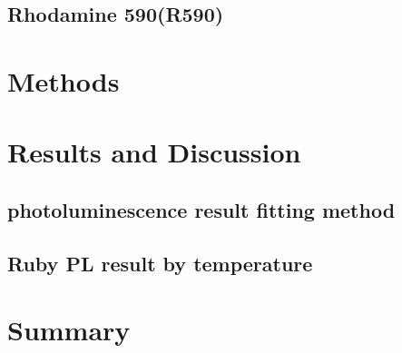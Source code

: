 \documentclass{article}
\begin{document}
\subsection{Rhodamine 590(R590)}



\section{Methods}

\section{Results and Discussion}
\subsection{photoluminescence result fitting method}
\label{result:iris_effect}

\subsection{Ruby PL result by temperature}
\label{result:temperature_peak_statics}



\section{Summary}

\cite{something}


\end{document}
